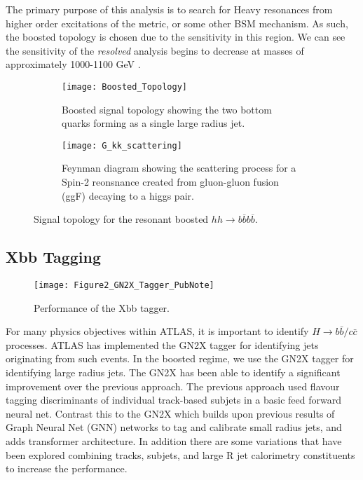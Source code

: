 \documentclass[12pt]{article}
\newcommand{\qqp}[1]{#1\overline{#1}#1\overline{#1}}
\begin{document}
The primary purpose of this analysis is to search for Heavy resonances from
higher order excitations of the metric, or some other BSM mechanism. As such,
the boosted topology is chosen due to the sensitivity in this region. We can see
the sensitivity of the \textit{resolved} analysis begins to decrease at masses
of approximately 1000-1100 GeV \cite{atlas_resonant_2022}. 

\begin{figure}[t]
    \centering
    \begin{subfigure}[t]{.48\textwidth}
        \centering
        \texttt{[image: Boosted\_Topology]}
        \caption{Boosted signal topology showing the two bottom quarks forming as a single large radius jet.}
        \label{subfig:boosted_topology}
    \end{subfigure}
    \hfill
    \begin{subfigure}[t]{.48\textwidth}
        \centering
        \texttt{[image: G\_kk\_scattering]}
        \caption{Feynman diagram showing the scattering process for a Spin-2
        reonsnance created from gluon-gluon fusion (ggF) decaying to a higgs pair.}
        \label{subfig:feynman}
    \end{subfigure}
    \caption{Signal topology for the resonant boosted $hh\rightarrow \qqp{b}$.}
\label{fig:signal_topologies}
\end{figure}

\subsection{Xbb Tagging}
\begin{figure}[t]
    \centering
    \texttt{[image: Figure2\_GN2X\_Tagger\_PubNote]}
    \caption{Performance of the Xbb tagger.}
    \label{fig:Xbb_tagger}
\end{figure}

For many physics objectives within ATLAS, it is important to identify
$H\rightarrow b\bar{b} / c\bar{c}$ processes. ATLAS has implemented the GN2X tagger
for identifying jets originating from such events. In the boosted regime, we use
the GN2X tagger for identifying large radius jets. The GN2X has been able to
identify a significant improvement over the previous approach. The previous
approach used flavour tagging discriminants of individual track-based subjets in
a basic feed forward neural net.  Contrast this to the GN2X which builds upon
previous results of Graph Neural Net (GNN) networks to tag and calibrate small
radius jets, and adds transformer architecture. In addition there are some
variations that have been explored combining tracks, subjets, and large R jet
calorimetry constituents to increase the performance.
\end{document}
